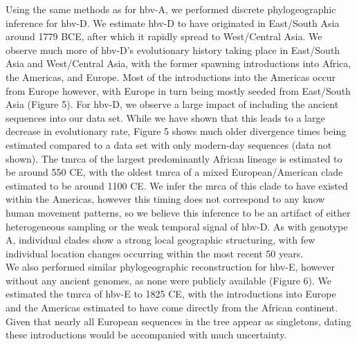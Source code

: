 Using the same methods as for \gls{hbv}-A, we performed discrete phylogeographic inference for \gls{hbv}-D.
We estimate \gls{hbv}-D to have originated in East/South Asia around 1779 BCE, after which it rapidly spread to West/Central Asia.
We observe much more of \gls{hbv}-D's evolutionary history taking place in East/South Asia and West/Central Asia, with the former spawning introductions into Africa, the Americas, and Europe.
Most of the introductions into the Americas occur from Europe however, with Europe in turn being mostly seeded from East/South Asia (Figure 5).
For \gls{hbv}-D, we observe a large impact of including the ancient sequences into our data set.
While we have shown that this leads to a large decrease in evolutionary rate, Figure 5 shows much older divergence times being estimated compared to a data set with only modern-day sequences (data not shown).
The \gls{tmrca} of the largest predominantly African lineage is estimated to be around 550 CE, with the oldest \gls{tmrca} of a mixed European/American clade estimated to be around 1100 CE.
We infer the \gls{mrca} of this clade to have existed within the Americas, however this timing does not correspond to any know human movement patterns, so we believe this inference to be an artifact of either heterogeneous sampling or the weak temporal signal of \gls{hbv}-D.
As with genotype A, individual clades show a strong local geographic structuring, with few individual location changes occurring within the most recent 50 years.\\

We also performed similar phylogeographic reconstruction for \gls{hbv}-E, however without any ancient genomes, as none were publicly available (Figure 6).
We estimated the \gls{tmrca} of \gls{hbv}-E to 1825 CE, with the introductions into Europe and the Americas estimated to have come directly from the African continent.
Given that nearly all European sequences in the tree appear as singletons, dating these introductions would be accompanied with much uncertainty.



